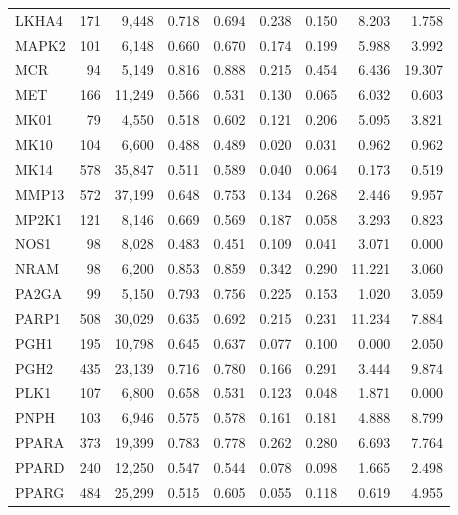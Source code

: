 \begin{center}
\begin{longtable}{@{}lrrrrrrrr@{}}
    LKHA4  & 171   & 9,448    & 0.718   & 0.694   & 0.238   & 0.150   & 8.203   & 1.758  \\
    MAPK2  & 101   & 6,148    & 0.660   & 0.670   & 0.174   & 0.199   & 5.988   & 3.992  \\
    MCR    & 94    & 5,149    & 0.816   & 0.888   & 0.215   & 0.454   & 6.436   & 19.307 \\
    MET    & 166   & 11,249   & 0.566   & 0.531   & 0.130   & 0.065   & 6.032   & 0.603  \\
    MK01   & 79    & 4,550    & 0.518   & 0.602   & 0.121   & 0.206   & 5.095   & 3.821  \\
    MK10   & 104   & 6,600    & 0.488   & 0.489   & 0.020   & 0.031   & 0.962   & 0.962  \\
    MK14   & 578   & 35,847   & 0.511   & 0.589   & 0.040   & 0.064   & 0.173   & 0.519  \\
    MMP13  & 572   & 37,199   & 0.648   & 0.753   & 0.134   & 0.268   & 2.446   & 9.957  \\
    MP2K1  & 121   & 8,146    & 0.669   & 0.569   & 0.187   & 0.058   & 3.293   & 0.823  \\
    NOS1   & 98    & 8,028    & 0.483   & 0.451   & 0.109   & 0.041   & 3.071   & 0.000  \\
    NRAM   & 98    & 6,200    & 0.853   & 0.859   & 0.342   & 0.290   & 11.221  & 3.060  \\
    PA2GA  & 99    & 5,150    & 0.793   & 0.756   & 0.225   & 0.153   & 1.020   & 3.059  \\
    PARP1  & 508   & 30,029   & 0.635   & 0.692   & 0.215   & 0.231   & 11.234  & 7.884  \\
    PGH1   & 195   & 10,798   & 0.645   & 0.637   & 0.077   & 0.100   & 0.000   & 2.050  \\
    PGH2   & 435   & 23,139   & 0.716   & 0.780   & 0.166   & 0.291   & 3.444   & 9.874  \\
    PLK1   & 107   & 6,800    & 0.658   & 0.531   & 0.123   & 0.048   & 1.871   & 0.000  \\
    PNPH   & 103   & 6,946    & 0.575   & 0.578   & 0.161   & 0.181   & 4.888   & 8.799  \\
    PPARA  & 373   & 19,399   & 0.783   & 0.778   & 0.262   & 0.280   & 6.693   & 7.764  \\
    PPARD  & 240   & 12,250   & 0.547   & 0.544   & 0.078   & 0.098   & 1.665   & 2.498  \\
    PPARG  & 484   & 25,299   & 0.515   & 0.605   & 0.055   & 0.118   & 0.619   & 4.955  \\

\end{longtable}
\end{center}
